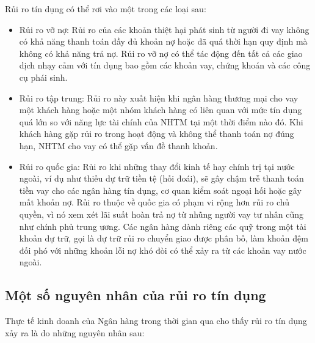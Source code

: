 Rủi ro tín dụng có thể rơi vào một trong các loại sau:
\begin{itemize}
\item Rủi ro vỡ nợ: Rủi ro của các khoản thiệt hại phát sinh từ người đi vay không có khả năng thanh toán đầy đủ khoản nợ hoặc đã quá thời hạn quy định mà không có khả năng trả nợ. Rủi ro vỡ nợ có thể tác động đến tất cả các giao dịch nhạy cảm với tín dụng bao gồm các khoản vay, chứng khoán và các công cụ phái sinh.
\item Rủi ro tập trung: Rủi ro này xuất hiện khi ngân hàng thương mại cho vay một khách hàng hoặc một nhóm khách hàng có liên quan với mức tín dụng quá lớn so với năng lực tài chính của NHTM tại một thời điểm nào đó. Khi khách hàng gặp rủi ro trong hoạt động và không thể thanh toán nợ đúng hạn, NHTM cho vay có thể gặp vấn đề thanh khoản.
\item Rủi ro quốc gia: Rủi ro khi những thay đổi kinh tế hay chính trị tại nước ngoài, ví dụ như thiếu dự trữ tiền tệ (hối đoái), sẽ gây chậm trễ thanh toán tiền vay cho các  ngân hàng tín dụng, cơ quan kiểm soát ngoại hối hoặc gây mất khoản nợ. Rủi ro thuộc về quốc gia có phạm vi rộng hơn rủi ro chủ quyền, vì nó xem xét lãi suất hoàn trả nợ từ nhũng người vay tư nhân cũng như chính phủ trung ương. Các ngân hàng dành riêng các quỹ trong một tài khoản dự trữ, gọi là dự trữ rủi ro chuyển giao được phân bố, làm khoản đệm đối phó với những khoản lỗi nợ khó đòi có thể xảy ra từ các khoản vay nước ngoài.
\end{itemize}

\subsection{Một số nguyên nhân của rủi ro tín dụng}
Thực tế kinh doanh của Ngân hàng trong thời gian qua cho thấy rủi ro tín dụng xảy ra là do những nguyên nhân sau:


